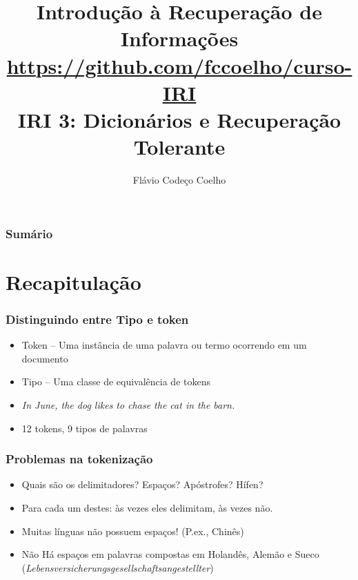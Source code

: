 \documentclass[compress]{beamer}
\title[Coelho: Dicionários e Recuperação Tolerante]
{Introdução à Recuperação de Informações\\
\large \url{https://github.com/fccoelho/curso-IRI}\\[0.5cm]
IRI 3: Dicionários e Recuperação Tolerante}
\author [Coelho F.C. \& Souza R.R.]{ Flávio Codeço Coelho}
\institute [EMAp, FGV]{Escola de Matemática Aplicada,   Fundação Getúlio Vargas}
\date
\begin{document}
\begin{frame}
\titlepage
\end{frame}

\begin{frame} %
\frametitle{Sumário}
  \tableofcontents
\end{frame}

\section{Recapitulação}

\begin{frame}
\frametitle{Distinguindo entre Tipo e token}
\begin{itemize}
\item {\color{blue}Token} -- Uma instância de uma palavra ou termo ocorrendo 
em um documento
\item {\color{blue}Tipo} -- Uma classe de equivalência de tokens
\item \emph{In June, the dog likes to chase the cat in the barn.}
\item 12 tokens, 9 tipos de palavras
\end{itemize}
\end{frame}

\begin{frame}
\frametitle{Problemas na tokenização}
\begin{itemize}
\item Quais são os delimitadores? Espaços? Apóstrofes? 
Hífen? 
\item Para cada um destes: às vezes eles delimitam, às vezes não.
\item Muitas línguas não possuem espaços! (P.ex.,
Chinês)
\item Não Há espaços em palavras compostas em Holandês, Alemão e Sueco
(\emph{Lebensversicherungsgesellschaftsangestellter})
\end{itemize}
\end{frame}
\end{document}
